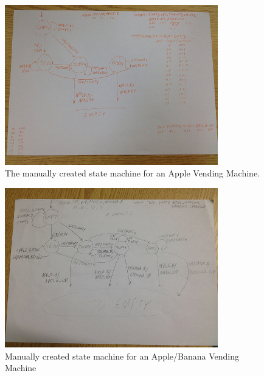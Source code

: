 \documentclass[12pt]{article}
\begin{document}
\begin{figure}
\centering
\includegraphics[width=350]{applefsm.jpg}
\caption{The manually created state machine for an Apple Vending Machine.}
\end{figure}
 
\begin{figure}
\centering
\includegraphics[width=350]{applebananafsm.jpg}
\caption{Manually created state machine for an Apple/Banana Vending Machine}
\end{figure}
\end{document}
